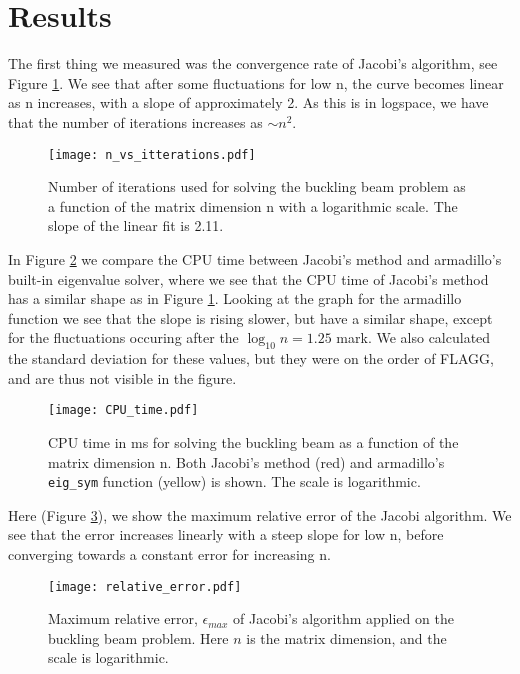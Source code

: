 \section{Results}
\label{sec:results}

The first thing we measured was the convergence rate of Jacobi's algorithm, see Figure \ref{fig:n_vs_it}.
We see that after some fluctuations for low n, the curve becomes linear as n increases, with a slope of approximately 2. 
As this is in logspace, we have that the number of iterations increases as $\sim  n^2$. 
\begin{figure}[htbp]
	\centering
	\texttt{[image: n\_vs\_itterations.pdf]}
	\caption{Number of iterations used for solving the buckling beam problem as a function of the matrix dimension n with a logarithmic scale. The slope of the linear fit is 2.11.}
	\label{fig:n_vs_it}
\end{figure}

In Figure \ref{fig:CPUtime} we compare the CPU time between Jacobi's method and
armadillo's built-in eigenvalue solver, where we see that the CPU time of Jacobi's method
has a similar shape as in Figure \ref{fig:n_vs_it}. Looking at the graph for the armadillo
function we see that the slope is rising slower, but have a similar shape, except
for the fluctuations occuring after the $\log_{10} n = 1.25$ mark. We also calculated
the standard deviation for these values, but they were on the order of FLAGG, and
are thus not visible in the figure.
\begin{figure}[htbp]
	\centering
	\texttt{[image: CPU\_time.pdf]}
	\caption{CPU time in ms for solving the buckling beam as a function of the matrix dimension n. Both Jacobi's method (red) and armadillo's \texttt{eig\_sym} function (yellow) is shown. The scale is logarithmic.}
	\label{fig:CPUtime}
\end{figure}

Here (Figure \ref{fig:error}), we show the maximum relative error of the Jacobi
algorithm. We see that the error increases linearly with a steep slope for low n,
before converging towards a constant error for increasing n.
\begin{figure}[htbp]
	\centering
	\texttt{[image: relative\_error.pdf]}
	\caption{Maximum relative error, $\epsilon_{max}$ of Jacobi's algorithm applied on the buckling beam problem.
	Here $n$ is the matrix dimension, and the scale is logarithmic.}
	\label{fig:error}
\end{figure}
